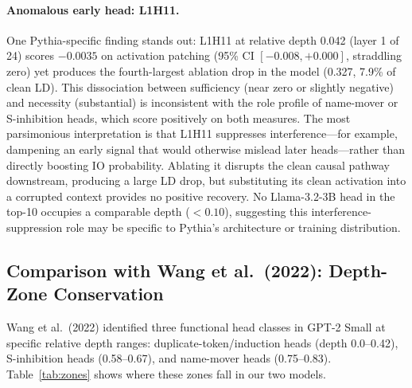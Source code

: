 \documentclass[11pt,a4paper]{article}
\begin{document}
\paragraph{Anomalous early head: L1H11.}
One Pythia-specific finding stands out: L1H11 at relative depth 0.042 (layer 1 of 24)
scores $-0.0035$ on activation patching (95\% CI $[-0.008, +0.000]$, straddling zero)
yet produces the fourth-largest ablation drop in the model (0.327, 7.9\% of clean LD).
This dissociation between sufficiency (near zero or slightly negative) and necessity
(substantial) is inconsistent with the role profile of name-mover or S-inhibition
heads, which score positively on both measures. The most parsimonious interpretation
is that L1H11 suppresses interference---for example, dampening an early signal that
would otherwise mislead later heads---rather than directly boosting IO probability.
Ablating it disrupts the clean causal pathway downstream, producing a large LD drop,
but substituting its clean activation into a corrupted context provides no positive
recovery. No Llama-3.2-3B head in the top-10 occupies a comparable depth ($< 0.10$),
suggesting this interference-suppression role may be specific to Pythia's architecture
or training distribution.

\subsection{Comparison with Wang et al.\ (2022): Depth-Zone Conservation}
\label{sec:comparison}

Wang et al.\ (2022) identified three functional head classes in GPT-2 Small at specific
relative depth ranges: duplicate-token/induction heads (depth 0.0--0.42), S-inhibition
heads (0.58--0.67), and name-mover heads (0.75--0.83). Table~\ref{tab:zones} shows
where these zones fall in our two models.
\end{document}
